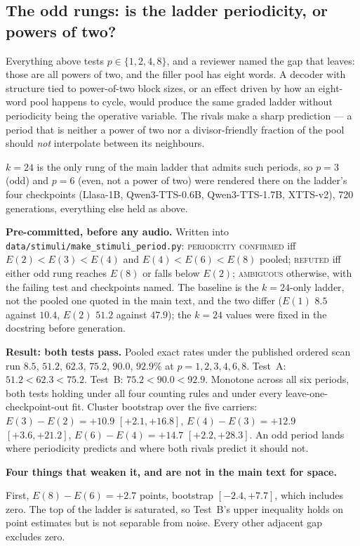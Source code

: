\documentclass[11pt]{article}
\begin{document}
\subsection{The odd rungs: is the ladder periodicity, or powers of two?}

Everything above tests $p \in \{1, 2, 4, 8\}$, and a reviewer named the gap that
leaves: those are all powers of two, and the filler pool has eight words. A
decoder with structure tied to power-of-two block sizes, or an effect driven by
how an eight-word pool happens to cycle, would produce the same graded ladder
without periodicity being the operative variable. The rivals make a sharp
prediction --- a period that is neither a power of two nor a divisor-friendly
fraction of the pool should \emph{not} interpolate between its neighbours.

$k{=}24$ is the only rung of the main ladder that admits such periods, so
$p{=}3$ (odd) and $p{=}6$ (even, not a power of two) were rendered there on the
ladder's four checkpoints (Llasa-1B, Qwen3-TTS-0.6B, Qwen3-TTS-1.7B, XTTS-v2),
720 generations, everything else held as above.

\textbf{Pre-committed, before any audio.} Written into
\texttt{data/stimuli/make\_stimuli\_period.py}: \textsc{periodicity confirmed}
iff $E(2) < E(3) < E(4)$ and $E(4) < E(6) < E(8)$ pooled; \textsc{refuted} iff
either odd rung reaches $E(8)$ or falls below $E(2)$; \textsc{ambiguous}
otherwise, with the failing test and checkpoints named. The baseline is the
$k{=}24$-only ladder, not the pooled one quoted in the main text, and the two
differ ($E(1)$ $8.5$ against $10.4$, $E(2)$ $51.2$ against $47.9$); the $k{=}24$
values were fixed in the docstring before generation.

\textbf{Result: both tests pass.} Pooled exact rates under the published ordered
scan run $8.5$, $51.2$, $62.3$, $75.2$, $90.0$, $92.9\%$ at
$p = 1, 2, 3, 4, 6, 8$. Test~A: $51.2 < 62.3 < 75.2$. Test~B:
$75.2 < 90.0 < 92.9$. Monotone across all six periods, both tests holding under
all four counting rules and under every leave-one-checkpoint-out fit. Cluster
bootstrap over the five carriers: $E(3)-E(2) = +10.9$ $[+2.1, +16.8]$,
$E(4)-E(3) = +12.9$ $[+3.6, +21.2]$, $E(6)-E(4) = +14.7$ $[+2.2, +28.3]$. An odd
period lands where periodicity predicts and where both rivals predict it should
not.

\textbf{Four things that weaken it, and are not in the main text for space.}

First, $E(8) - E(6) = +2.7$ points, bootstrap $[-2.4, +7.7]$, which includes
zero. The top of the ladder is saturated, so Test~B's upper inequality holds on
point estimates but is not separable from noise. Every other adjacent gap
excludes zero.
\end{document}
